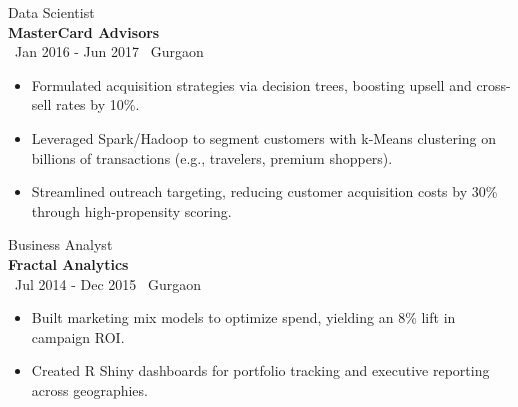 {\large Data Scientist} \\
\textbf{MasterCard Advisors} \\
\faCalendar \, Jan 2016 - Jun 2017 \hfill \faMapMarker \, Gurgaon
\begin{itemize}[itemsep=1pt, topsep=0pt]
    \item Formulated acquisition strategies via decision trees, boosting upsell and cross-sell rates by 10\%.
    \item Leveraged Spark/Hadoop to segment customers with k-Means clustering on billions of transactions (e.g., travelers, premium shoppers).
    \item Streamlined outreach targeting, reducing customer acquisition costs by 30\% through high-propensity scoring.
\end{itemize}

{\large Business Analyst} \\
\textbf{Fractal Analytics} \\
\faCalendar \, Jul 2014 - Dec 2015 \hfill \faMapMarker \, Gurgaon
\begin{itemize}[itemsep=1pt, topsep=0pt]
    \item Built marketing mix models to optimize spend, yielding an 8\% lift in campaign ROI.
    \item Created R Shiny dashboards for portfolio tracking and executive reporting across geographies.
\end{itemize}
